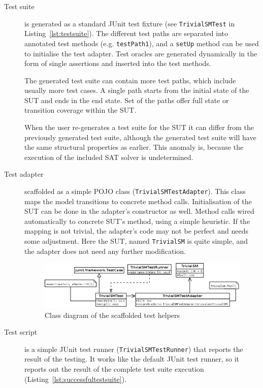 \begin{description}
	\item[Test suite] is generated as a standard JUnit test fixture (see \texttt{TrivialSMTest} in Listing~\ref{lst:testsuite}). The different test paths are separated into annotated test methods (e.g. \texttt{testPath1}), and a \texttt{setUp} method can be used to initialise the test adapter. Test oracles are generated dynamically in the form of single assertions and inserted into the test methods.
	
	The generated test suite can contain more test paths, which include usually more test cases. A single path starts from the initial state of the SUT and ends in the end state. Set of the paths offer full state or transition coverage within the SUT.
	
	When the user re-generates a test suite for the SUT it can differ from the previously generated test suite, although the generated test suite will have the same structural properties as earlier. This anomaly is, because the execution of the included SAT solver is undetermined.
	\item[Test adapter] scaffolded as a simple POJO class (\texttt{TrivialSMTestAdapter}). This class maps the model transitions to concrete method calls. Initialisation of the SUT can be done in the adapter's constructor as well. Method calls wired automatically to concrete SUT's method, using a simple heuristic. If the mapping is not trivial, the adapter's code may not be perfect and needs some adjustment. Here the SUT, named \texttt{TrivialSM} is quite simple, and the adapter does not need any further modification.
	
\begin{figure}[htp]
\centering
\includegraphics[scale=0.32]{figures/implementation_testhelpers}
\caption{Class diagram of the scaffolded test helpers}
\label{fig:implementation_testhelpers}
\end{figure}

	\item[Test script] is a simple JUnit test runner (\texttt{TrivialSMTestRunner}) that reports the result of the testing. It works like the default JUnit test runner, so it reports out the result of the complete test suite execution (Listing~\ref{lst:successfultestsuite}).


\end{description}
